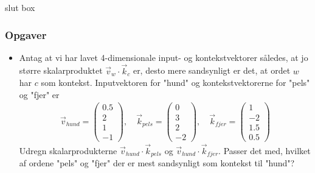 \documentclass{article}
\newcommand{\am}[1]{{\color{red} #1}}
\begin{document}
\am{slut box}
 
\subsubsection*{Opgaver} 

\begin{itemize}
\item Antag at vi har lavet 4-dimensionale input- og kontekstvektorer således, at jo større skalarproduktet $\overrightarrow{v}_{w}\cdot \overrightarrow{k}_{c}$ er, desto mere sandsynligt er det, at ordet $w$ har $c $ som kontekst. Inputvektoren for "hund"  og kontekstvektorerne for "pels" og "fjer" er
\begin{align*}
\overrightarrow{v}_{hund}=\begin{pmatrix} 0.5\\2\\1\\-1\end{pmatrix} ,\quad
\overrightarrow{k}_{pels}=\begin{pmatrix} 0\\3\\2\\-2\end{pmatrix},\quad
\overrightarrow{k}_{fjer}=\begin{pmatrix} 1\\-2\\1.5\\0.5\end{pmatrix}
\end{align*}
Udregn skalarprodukterne $\overrightarrow{v}_{hund}\cdot \overrightarrow{k}_{pels}$ og $\overrightarrow{v}_{hund}\cdot \overrightarrow{k}_{fjer}$. Passer det med, hvilket af ordene "pels" og "fjer" der er mest sandsynligt som kontekst til "hund"?


\end{itemize}
\end{document}
